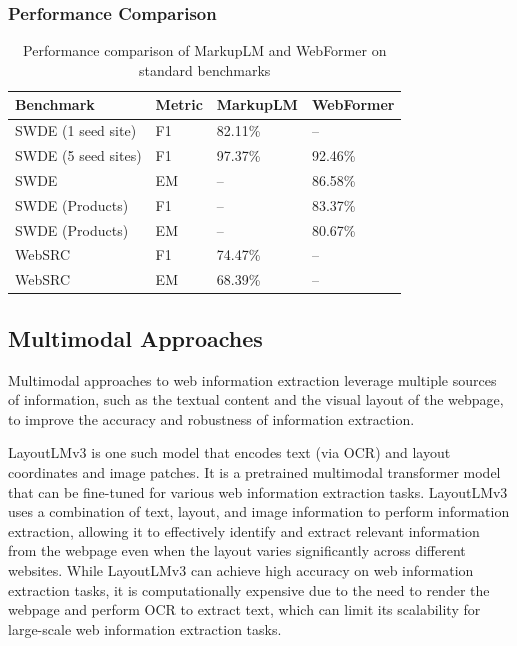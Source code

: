 \subsubsection{Performance Comparison}\label{subsubsec:performance_comparison}
\begin{table}[h]
    \centering
    \small
    \renewcommand{\arraystretch}{1.4}
    \begin{tabularx}{\textwidth}{X l l l}
        \toprule
        \textbf{Benchmark} & \textbf{Metric} & \textbf{MarkupLM} & \textbf{WebFormer} \\
        \midrule
        SWDE (1 seed site)  & F1 & 82.11\% & --      \\
        SWDE (5 seed sites) & F1 & 97.37\% & 92.46\% \\
        SWDE                & EM & --      & 86.58\% \\
        SWDE (Products)     & F1 & --      & 83.37\% \\
        SWDE (Products)     & EM & --      & 80.67\% \\
        WebSRC              & F1 & 74.47\% & --      \\
        WebSRC              & EM & 68.39\% & --      \\
        \bottomrule
    \end{tabularx}
    \caption{Performance comparison of MarkupLM and WebFormer on standard benchmarks}
    \label{tab:markuplm-webformer-performance}
\end{table}

\subsection{Multimodal Approaches}\label{subsec:multimodal_approaches}
Multimodal approaches to web information extraction leverage multiple sources of information, such as the textual content and the visual layout of the webpage, to improve the accuracy and robustness of information extraction.

LayoutLMv3\cite{huang2022layoutlmv3} is one such model that encodes text (via OCR) and layout coordinates and image patches.
It is a pretrained multimodal transformer model that can be fine-tuned for various web information extraction tasks.
LayoutLMv3 uses a combination of text, layout, and image information to perform information extraction, allowing it to effectively identify and extract relevant information from the webpage even when the layout varies significantly across different websites.
While LayoutLMv3 can achieve high accuracy on web information extraction tasks, it is computationally expensive due to the need to render the webpage and perform OCR to extract text, which can limit its scalability for large-scale web information extraction tasks.

